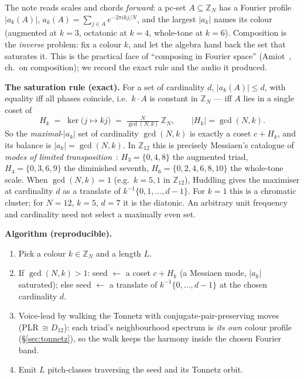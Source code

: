 \documentclass[11pt]{article}
\newcommand{\Zn}[1]{\mathbb{Z}_{#1}}
\begin{document}
The note reads scales and chords \emph{forward}: a pc-set $A\subseteq\Zn{N}$ has a Fourier profile
$|a_k(A)|$, $a_k(A)=\sum_{j\in A}e^{-2\pi i kj/N}$, and the largest $|a_k|$ names its colour (augmented at
$k{=}3$, octatonic at $k{=}4$, whole-tone at $k{=}6$). Composition is the \emph{inverse} problem: fix a
colour $k$, and let the algebra hand back the set that saturates it. This is the practical face of
``composing in Fourier space'' (Amiot~\cite{Amiot}, ch.~on composition); we record the exact rule and the
audio it produced.

\textbf{The saturation rule (exact).} For a set of cardinality $d$, $|a_k(A)|\le d$, with equality iff all
phases coincide, i.e.\ $k\!\cdot\!A$ is constant in $\Zn{N}$ --- iff $A$ lies in a single coset of
\[
  H_k \;=\; \ker\bigl(j\mapsto kj\bigr) \;=\; \tfrac{N}{\gcd(N,k)}\,\Zn{N},
  \qquad |H_k|=\gcd(N,k).
\]
So the \emph{maximal}-$|a_k|$ set of cardinality $\gcd(N,k)$ is exactly a coset $c+H_k$, and its balance is
$|a_k|=\gcd(N,k)$. In $\Zn{12}$ this is precisely Messiaen's catalogue of \emph{modes of limited
transposition}~\cite{Messiaen}: $H_3=\{0,4,8\}$ the augmented triad, $H_4=\{0,3,6,9\}$ the diminished
seventh, $H_6=\{0,2,4,6,8,10\}$ the whole-tone scale. When $\gcd(N,k)=1$ (e.g.\ $k{=}5,1$ in $\Zn{12}$),
Huddling gives the maximiser at cardinality $d$ as a translate of
$k^{-1}\{0,1,\ldots,d-1\}$. For $k=1$ this is a chromatic cluster; for $N=12$, $k=5$, $d=7$
it is the diatonic. An arbitrary unit frequency and cardinality need not select a maximally even set.

\textbf{Algorithm (reproducible).}
\begin{enumerate}\setlength\itemsep{0pt}
  \item Pick a colour $k\in\Zn{N}$ and a length $L$.
  \item If $\gcd(N,k)>1$: seed $\leftarrow$ a coset $c+H_k$ (a Messiaen mode, $|a_k|$ saturated);
        else seed $\leftarrow$ a translate of $k^{-1}\{0,\ldots,d-1\}$ at the chosen cardinality $d$.
  \item Voice-lead by walking the Tonnetz with conjugate-pair-preserving moves (PLR$\,\cong D_{12}$): each
        triad's neighbourhood spectrum is \emph{its own} colour profile (\S\ref{sec:tonnetz}), so the walk
        keeps the harmony inside the chosen Fourier band.
  \item Emit $L$ pitch-classes traversing the seed and its Tonnetz orbit.
\end{enumerate}
\end{document}
